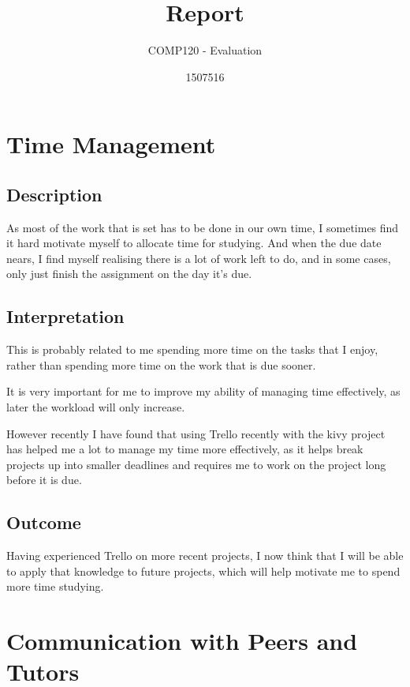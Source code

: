 \documentclass{scrartcl}
\title{Report}
\subtitle{COMP120 - Evaluation}
\author{1507516}
\begin{document}
\maketitle


\section{Time Management}

\subsection{Description} 

As most of the work that is set has to be done in our own time, I sometimes find it hard motivate myself to allocate time for studying. And when the due date nears, I find myself realising there is a lot of work left to do, and in some cases, only just finish the assignment on the day it's due.

\subsection{Interpretation} 

This is probably related to me spending more time on the tasks that I enjoy, rather than spending more time on the work that is due sooner. 

It is very important for me to improve my ability of managing time effectively, as later the workload will only increase. 

However recently I have found that using Trello recently with the kivy project has helped me a lot to manage my time more effectively, as it helps break projects up into smaller deadlines and requires me to work on the project long before it is due.

\subsection{Outcome} 

Having experienced Trello on more recent projects, I now think that I will be able to apply that knowledge to future projects, which will help motivate me to spend more time studying. 

\section{Communication with Peers and Tutors}
\end{document}
